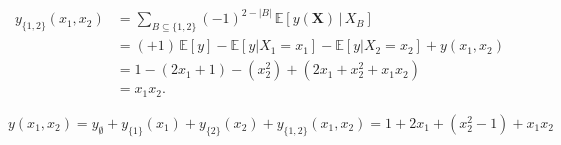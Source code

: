 \begin{frame}
  \begin{align*}
    y_{\{1,2\}}(x_1,x_2)
    &= \sum_{B \subseteq \{1,2\}} (-1)^{2-|B|}
       \,\mathbb{E}[y(\boldsymbol{X})\,|\,X_B] \\[2pt]
    &= (+1)\,\mathbb{E}[y] 
     - \mathbb{E}[y|X_1=x_1]
     - \mathbb{E}[y|X_2=x_2]
     + y(x_1,x_2) \\[2pt]
    &= 1 - (2x_1+1) - (x_2^2) + (2x_1+x_2^2+x_1x_2) \\[2pt]
    &= x_1 x_2.
\end{align*}

\[
y(x_1,x_2)
= y_{\emptyset} + y_{\{1\}}(x_1) + y_{\{2\}}(x_2) + y_{\{1,2\}}(x_1,x_2)
= 1 + 2x_1 + (x_2^2 - 1) + x_1 x_2
\]

\end{frame}


